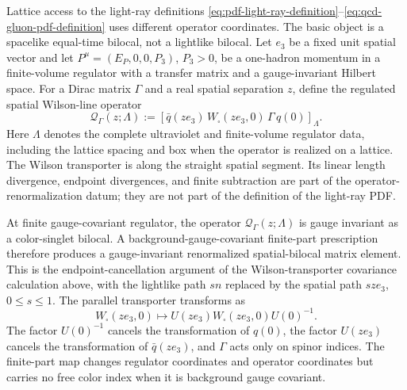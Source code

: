 Lattice access to the light-ray definitions
\eqref{eq:pdf-light-ray-definition}--\eqref{eq:qcd-gluon-pdf-definition}
uses different operator coordinates.  The basic object is a spacelike
equal-time bilocal, not a lightlike bilocal.  Let \(e_3\) be a fixed unit
spatial vector and let \(P^\mu=(E_P,0,0,P_3)\), \(P_3>0\), be a one-hadron
momentum in a finite-volume regulator with a transfer matrix and a
gauge-invariant Hilbert space.  For a Dirac matrix \(\Gamma\) and a real
spatial separation \(z\), define the regulated spatial Wilson-line operator
\begin{equation}
  \mathcal Q_\Gamma(z;\Lambda)
  :=
  \left[
    \bar q(z e_3)\,
    W_{\square}(z e_3,0)\,
    \Gamma\,q(0)
  \right]_{\Lambda}.
  \label{eq:qcd-spatial-bilocal-operator}
\end{equation}
Here \(\Lambda\) denotes the complete ultraviolet and finite-volume regulator
data, including the lattice spacing and box when the operator is realized on a
lattice.  The Wilson transporter is along the straight spatial segment.  Its
linear length divergence, endpoint divergences, and finite subtraction are
part of the operator-renormalization datum; they are not part of the
definition of the light-ray PDF.

At finite gauge-covariant regulator, the operator
\(\mathcal Q_\Gamma(z;\Lambda)\) is gauge invariant as a color-singlet
bilocal.  A background-gauge-covariant finite-part prescription therefore
produces a gauge-invariant renormalized spatial-bilocal matrix element.
This is the endpoint-cancellation argument of
the Wilson-transporter covariance calculation above, with the lightlike path
\(s n\) replaced by the spatial path \(s z e_3\), \(0\le s\le1\).  The
parallel transporter transforms as
\[
  W_{\square}(z e_3,0)
  \longmapsto
  U(z e_3)W_{\square}(z e_3,0)U(0)^{-1}.
\]
The factor \(U(0)^{-1}\) cancels the transformation of \(q(0)\), the factor
\(U(z e_3)\) cancels the transformation of \(\bar q(z e_3)\), and \(\Gamma\)
acts only on spinor indices.  The finite-part map changes regulator
coordinates and operator coordinates but carries no free color index when it
is background gauge covariant.

